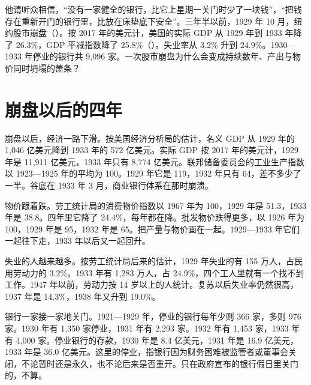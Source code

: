 他请听众相信，“没有一家健全的银行，比它上星期一关门时少了一块钱”，“把钱存在重新开门的银行里，比放在床垫底下安全”\cite{fdr1933}。三年半以前，1929 年 10 月，纽约股市崩盘（）。按 2017 年的美元计，美国的实际 GDP 从 1929 年到 1933 年降了 26.3\%，GDP 平减指数降了 25.8\%（）\cite{bea2026}。失业率从 3.2\% 升到 24.9\%\cite{census1975a}。1930—1933 年停业的银行共 9,096 家\cite{frb1937b}。一次股市崩盘为什么会变成持续数年、产出与物价同时坍塌的萧条？

\section{崩盘以后的四年}\label{sec:depressionus-world}

崩盘以后，经济一路下滑。按美国经济分析局的估计，名义 GDP 从 1929 年的 1,046 亿美元降到 1933 年的 572 亿美元\cite{bea2026}。实际 GDP 按 2017 年的美元计，1929 年是 11,911 亿美元，1933 年只有 8,774 亿美元\cite{bea2026}。联邦储备委员会的工业生产指数以 1923—1925 年的平均为 100。1929 年它是 119，1932 年只有 64，差不多少了一半\cite{frb1937a}。谷底在 1933 年 3 月，商业银行体系在那时崩溃\cite{frhgd}。

物价跟着跌。劳工统计局的消费物价指数以 1967 年为 100，1929 年是 51.3，1933 年是 38.8\cite{census1975a}。四年里它降了 24.4\%，每年都在降。批发物价跌得更多，以 1926 年为 100，1929 年是 95，1932 年是 65\cite{frb1937a}。把产量与物价画在一起。1929—1933 年它们一起往下走，1933 年以后又一起回升。

失业的人越来越多。按劳工统计局后来的估计，1929 年失业的有 155 万人，占民用劳动力的 3.2\%\cite{census1975a}。1933 年有 1,283 万人，占 24.9\%，四个工人里就有一个找不到工作\cite{census1975a}。1947 年以前，劳动力按 14 岁以上的人统计\cite{census1975a}。复苏以后失业率仍然很高，1937 年是 14.3\%，1938 年又升到 19.0\%\cite{census1975a}。


银行一家接一家地关门。1921—1929 年，停业的银行每年少则 366 家，多则 976 家\cite{frb1937b}。1930 年有 1,350 家停业，1931 年有 2,293 家\cite{frb1937b}。1932 年有 1,453 家，1933 年有 4,000 家\cite{frb1937b}。停业银行的存款，1930 年是 8.4 亿美元，1931 年是 16.9 亿美元，1933 年是 36.0 亿美元\cite{frb1937b}。这里的停业，指银行因为财务困难被监管者或董事会关闭，不论暂时还是永久，也不论后来是否重开。只在政府宣布的银行假日里关门的，不算\cite{frb1937b}。

